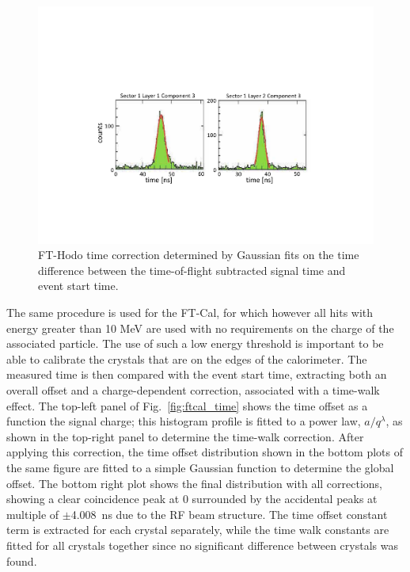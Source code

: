 \begin{figure}
\includegraphics[width=1.0\columnwidth]{fig/fthodo_time.pdf}
\caption{FT-Hodo time correction determined by Gaussian fits on the time difference between the time-of-flight
  subtracted signal time and event start time.}
\label{fig:fthodo_time}
\end{figure}

The same procedure is used for the FT-Cal, for which however all hits with energy greater than 10 MeV are used
with no requirements on the charge of the associated particle. The use of such a low energy threshold is important
to be able to calibrate the crystals that are on the edges of the calorimeter. The measured time is then compared
with the event start time, extracting both an overall offset and a charge-dependent correction, associated with a
time-walk effect. The top-left panel of Fig.~\ref{fig:ftcal_time} shows the time offset as  a function the
signal charge; this histogram profile is fitted to a power law, $a/q^\lambda$, as shown in the top-right panel to
determine the time-walk correction. After applying this correction, the time offset distribution shown in the bottom
plots  of the same figure are fitted to a simple Gaussian function to determine the global offset. The bottom right
plot shows the final distribution with all corrections, showing a clear  coincidence peak at 0 surrounded by the
accidental peaks at multiple of $\pm$4.008~ns  due to the RF beam structure. The time offset constant term is
extracted for each crystal separately, while the time walk constants are fitted for all crystals together since no
significant difference between crystals was found. 

